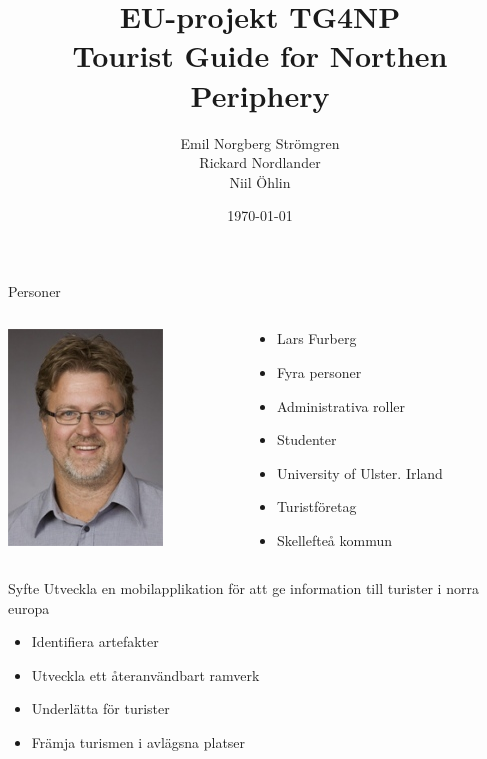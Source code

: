 \documentclass{beamer}
\title{EU-projekt TG4NP \\Tourist Guide for Northen Periphery}
\author{Emil Norgberg Strömgren \\ Rickard Nordlander \\ Niil Öhlin}
\date{\today}
\begin{document}
	\begin{frame}
		\titlepage
	\end{frame}
	
	\begin{frame}{Personer}
		\begin{columns}
			\begin{column}[T]{5cm}
				\includegraphics[scale=0.7]{furberg_lars2.jpg}
			\end{column}
			\begin{column}[T]{5cm}
				\begin{itemize}
					\item Lars Furberg
					\item<2-> Fyra personer
					\item<3-> Administrativa roller
					\item<4-> Studenter
					\item<5-> University of Ulster. Irland
					\item<6-> Turistföretag
					\item<7-> Skellefteå kommun
				\end{itemize}
			\end{column}

		\end{columns}
	\end{frame}

	\begin{frame}{Syfte}
		Utveckla en mobilapplikation för att ge information till turister i norra europa
		\begin{itemize}
			\item<1-> Identifiera artefakter
			\item<2-> Utveckla ett återanvändbart ramverk
			\item<3-> Underlätta för turister
			\item<4-> Främja turismen i avlägsna platser
		\end{itemize}
	\end{frame}
\end{document}
